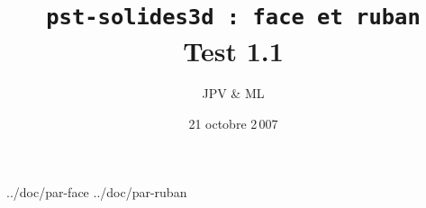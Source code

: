 \documentclass{article}
\title{\texttt{pst-solides3d : face et ruban}\\
       Test 1.1}
\date{21 octobre 2\,007}
\author{JPV \& ML}
\begin{document}
\maketitle

\def \datapath {%
   ../doc/}

 \datapath par-face
 \datapath par-ruban
\end{document}
